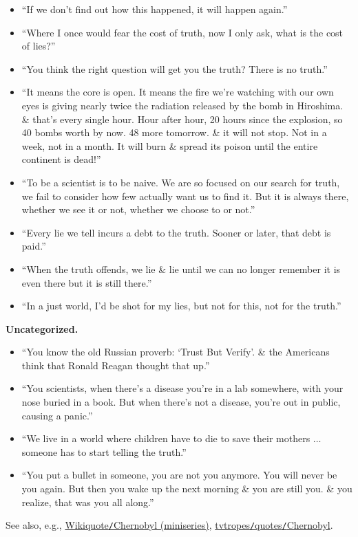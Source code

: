 \documentclass{article}
\begin{document}
\begin{enumerate}
\begin{itemize}
		\item ``If we don't find out how this happened, it will happen again.''
		\item ``Where I once would fear the cost of truth, now I only ask, what is the cost of lies?''
		\item ``You think the right question will get you the truth? There is no truth.''
		\item ``It means the core is open. It means the fire we're watching with our own eyes is giving nearly twice the radiation released by the bomb in Hiroshima. \& that's every single hour. Hour after hour, 20 hours since the explosion, so 40 bombs worth by now. 48 more tomorrow. \& it will not stop. Not in a week, not in a month. It will burn \& spread its poison until the entire continent is dead!''
		\item ``To be a scientist is to be naive. We are so focused on our search for truth, we fail to consider how few actually want us to find it. But it is always there, whether we see it or not, whether we choose to or not.''
		\item ``Every lie we tell incurs a debt to the truth. Sooner or later, that debt is paid.''
		\item ``When the truth offends, we lie \& lie until we can no longer remember it is even there but it is still there.''
		\item ``In a just world, I'd be shot for my lies, but not for this, not for the truth.''
	\end{itemize}
	\textbf{Uncategorized.}
	\begin{itemize}
		\item ``You know the old Russian proverb: `Trust But Verify'. \& the Americans think that Ronald Reagan thought that up.''
		\item ``You scientists, when there's a disease you're in a lab somewhere, with your nose buried in a book. But when there's not a disease, you're out in public, causing a panic.''
		\item ``We live in a world where children have to die to save their mothers $\ldots$ someone has to start telling the truth.''
		\item ``You put a bullet in someone, you are not you anymore. You will never be you again. But then you wake up the next morning \& you are still you. \& you realize, that was you all along.''
	\end{itemize}
	See also, e.g., \href{https://en.wikiquote.org/wiki/Chernobyl_(miniseries)}{Wikiquote\texttt{/}Chernobyl (miniseries)}, \href{https://tvtropes.org/pmwiki/pmwiki.php/Quotes/Chernobyl}{tvtropes\texttt{/}quotes\texttt{/}Chernobyl}.

\end{enumerate}
\end{document}
